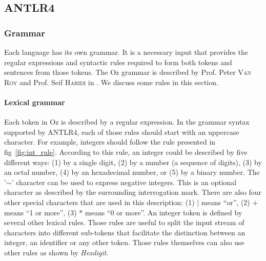 \documentclass[11pt,a4paper,twoside,openright]{report}
\begin{document}
\subsection{ANTLR4}
\subsubsection{Grammar}

Each language has its own grammar. It is a necessary input that provides 
the regular expressions and syntactic rules required to form both tokens and 
sentences from those tokens. The Oz grammar is described by Prof. Peter 
\textsc{Van Roy} and Prof. Seif \textsc{Haridi} in \cite{vanroy_haridi_oz}.  We 
discuss some rules in this section.

\paragraph{Lexical grammar}
Each token in Oz is described by a regular expression. In the grammar syntax 
supported by \textsc{ANTLR4}, each of those rules should start with an 
uppercase character. For example, integers should follow the rule presented in 
fig~\ref{fig:int_rule}. According to this rule, an integer could be 
described by five different ways: (1) by a single digit, (2) by a number (a 
sequence of digits), (3) by an octal number, (4) by an hexadecimal number, or 
(5) by a binary number. The '$\sim$' character can be used to express negative 
integers. This is an optional character as described by the surrounding 
interrogation mark. There are also four other special characters that are used 
in this description: (1) $\vert$ means \enquote{or}, (2) $+$ means \enquote{1 
or more}, (3) $*$ means \enquote{0 or more}. An integer token is defined 
by several other lexical rules. Those rules are useful to split the input 
stream 
of characters into different sub-tokens that facilitate the distinction between 
an integer, an identifier or any other token. Those rules themselves can also 
use other rules as shown by \textit{Hexdigit}.\\
\end{document}
